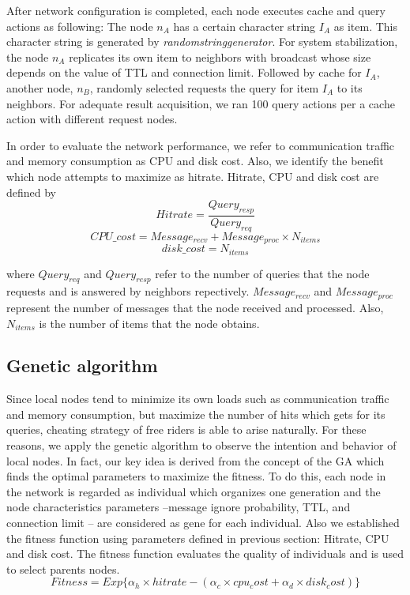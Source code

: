 \documentclass[12pt,journal,draftcls,letterpaper,onecolumn]{IEEEtran}
\begin{document}
After network configuration is completed, each node executes cache and query actions as
following: The node $n_A$ has a certain character string $I_A$ as item. This character string is
generated by \emph{randomstringgenerator}. For system stabilization, the node $n_A$ replicates its own
item to neighbors with broadcast whose size depends on the value of TTL and connection
limit. Followed by cache for $I_A$, another node, $n_B$, randomly selected requests the query for
item $I_A$ to its neighbors. For adequate result acquisition, we ran 100 query actions per a cache
action with different request nodes.

In order to evaluate the network performance, we refer to communication traffic and
memory consumption as CPU and disk cost. Also, we identify the benefit which node
attempts to maximize as hitrate. Hitrate, CPU and disk cost are defined by
\[
Hitrate=\frac{Query_{resp}}{Query_{req}}
\]
\[
CPU\_cost=Message_{recv}+Message_{proc} \times N_{items}
\]
\[
disk\_cost=N_{items}
\]

where $Query_{req}$ and $Query_{resp}$ refer to the number of queries that 
the node requests and is answered by neighbors repectively. $Message_{recv}$ and $Message_{proc}$ 
represent the number of messages that the node received and processed. 
Also, $N_{items}$ is the number of items that the node obtains.

\subsection{Genetic algorithm}\label{sec:genetic}
Since local nodes tend to minimize its own loads such as communication traffic and memory
consumption, but maximize the number of hits which gets for its queries, cheating strategy of
free riders is able to arise naturally. For these reasons, we apply the genetic algorithm to
observe the intention and behavior of local nodes. In fact, our key idea is derived from the
concept of the GA which finds the optimal parameters to maximize the fitness. To do this,
each node in the network is regarded as individual which organizes one generation and the
node characteristics parameters –message ignore probability, TTL, and connection limit – are
considered as gene for each individual.
Also we established the fitness function using parameters defined in previous section: Hitrate,
CPU and disk cost. The fitness function evaluates the quality of individuals and is used to
select parents nodes.
\[
Fitness = Exp\{\alpha_{h}\times hitrate-(\alpha_{c}\times cpu_cost + \alpha_{d}\times disk_cost)\}
\]
\end{document}
